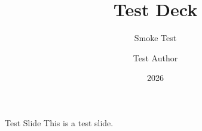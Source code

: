\documentclass[aspectratio=169,10pt]{beamer}
\title{Test Deck}
\subtitle{Smoke Test}
\author{Test Author}
\date{2026}
\begin{document}
\begin{frame}{Test Slide}
  This is a test slide.
\end{frame}
\end{document}
